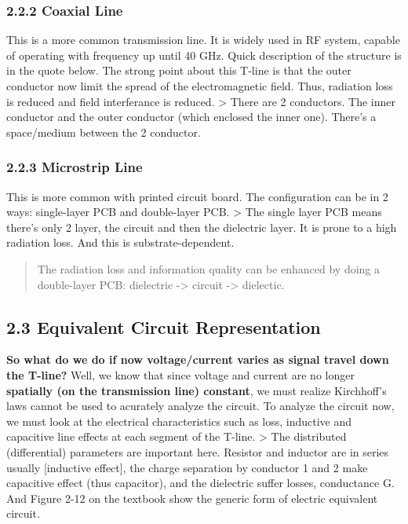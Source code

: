 \documentclass[11pt]{article}
\begin{document}
\hypertarget{coaxial-line}{%
\subsubsection{2.2.2 Coaxial Line}\label{coaxial-line}}

This is a more common transmission line. It is widely used in RF system,
capable of operating with frequency up until 40 GHz. Quick description
of the structure is in the quote below. The strong point about this
T-line is that the outer conductor now limit the spread of the
electromagnetic field. Thus, radiation loss is reduced and field
interferance is reduced. \textgreater{} There are 2 conductors. The
inner conductor and the outer conductor (which enclosed the inner one).
There's a space/medium between the 2 conductor.

\hypertarget{microstrip-line}{%
\subsubsection{2.2.3 Microstrip Line}\label{microstrip-line}}

This is more common with printed circuit board. The configuration can be
in 2 ways: single-layer PCB and double-layer PCB. \textgreater{} The
single layer PCB means there's only 2 layer, the circuit and then the
dielectric layer. It is prone to a high radiation loss. And this is
substrate-dependent.

\begin{quote}
The radiation loss and information quality can be enhanced by doing a
double-layer PCB: dielectric -\textgreater{} circuit -\textgreater{}
dielectic.
\end{quote}

\hypertarget{equivalent-circuit-representation}{%
\subsection{2.3 Equivalent Circuit
Representation}\label{equivalent-circuit-representation}}

\textbf{So what do we do if now voltage/current varies as signal travel
down the T-line?} Well, we know that since voltage and current are no
longer \textbf{spatially (on the transmission line) constant}, we must
realize Kirchhoff's laws cannot be used to acurately analyze the
circuit. To analyze the circuit now, we must look at the electrical
characteristics such as loss, inductive and capacitive line effects at
each segment of the T-line. \textgreater{} The distributed
(differential) parameters are important here. Resistor and inductor are
in series usually {[}inductive effect{]}, the charge separation by
conductor 1 and 2 make capacitive effect (thus capacitor), and the
dielectric suffer losses, conductance G. And Figure 2-12 on the textbook
show the generic form of electric equivalent circuit.
\end{document}
